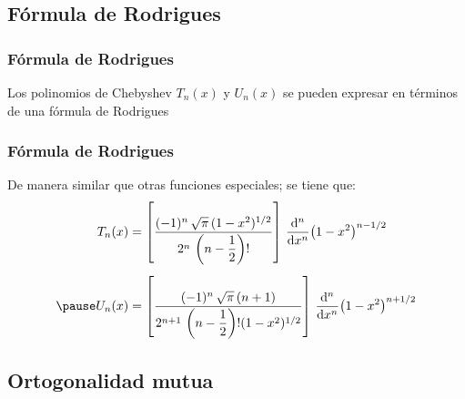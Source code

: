 \documentclass[12pt]{beamer}
\begin{document}
\subsection{Fórmula de Rodrigues}

\begin{frame}
\frametitle{Fórmula de Rodrigues}
Los polinomios de Chebyshev $T_{n}(x)$ y $U_{n}(x)$ se pueden expresar en términos de una fórmula de Rodrigues
\end{frame}
\begin{frame}
\frametitle{Fórmula de Rodrigues}
De manera similar que otras funciones especiales; se tiene que:
\pause
\begin{eqnarray*}
\begin{aligned}
T_{n}(x) &= \left[ \dfrac{(-1)^{n} \, \sqrt{\pi} \, (1 - x^{2})^{1/2}}{2^{n} \, \left( n - \dfrac{1}{2} \right)!} \right] \, \dv[n]{x} (1 - x^{2})^{n-1/2} \\[0.5em] \pause
U_{n}(x) &= \left[ \dfrac{(-1)^{n} \, \sqrt{\pi} \, (n+1)}{2^{n+1} \, \left( n - \dfrac{1}{2} \right)! (1 - x^{2})^{1/2}} \right] \, \dv[n]{x} (1 - x^{2})^{n+1/2}
\end{aligned}
\end{eqnarray*}
\end{frame}

\subsection{Ortogonalidad mutua}
\end{document}
